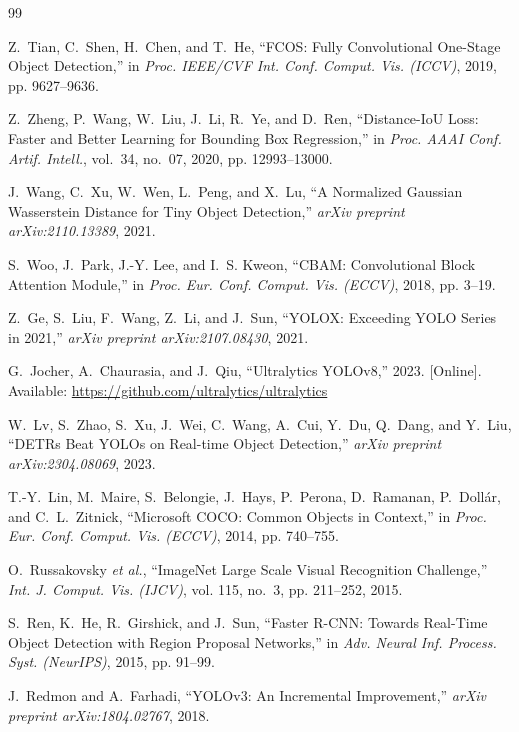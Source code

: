 \documentclass[conference]{IEEEtran}
\begin{document}
\begin{thebibliography}{99}

Z.~Tian, C.~Shen, H.~Chen, and T.~He, ``FCOS: Fully Convolutional One-Stage Object Detection,'' in \textit{Proc. IEEE/CVF Int. Conf. Comput. Vis. (ICCV)}, 2019, pp. 9627--9636.

Z.~Zheng, P.~Wang, W.~Liu, J.~Li, R.~Ye, and D.~Ren, ``Distance-IoU Loss: Faster and Better Learning for Bounding Box Regression,'' in \textit{Proc. AAAI Conf. Artif. Intell.}, vol.~34, no.~07, 2020, pp. 12993--13000.

J.~Wang, C.~Xu, W.~Wen, L.~Peng, and X.~Lu, ``A Normalized Gaussian Wasserstein Distance for Tiny Object Detection,'' \textit{arXiv preprint arXiv:2110.13389}, 2021.

S.~Woo, J.~Park, J.-Y. Lee, and I.~S. Kweon, ``CBAM: Convolutional Block Attention Module,'' in \textit{Proc. Eur. Conf. Comput. Vis. (ECCV)}, 2018, pp. 3--19.

Z.~Ge, S.~Liu, F.~Wang, Z.~Li, and J.~Sun, ``YOLOX: Exceeding YOLO Series in 2021,'' \textit{arXiv preprint arXiv:2107.08430}, 2021.

G.~Jocher, A.~Chaurasia, and J.~Qiu, ``Ultralytics YOLOv8,'' 2023. [Online]. Available: \url{https://github.com/ultralytics/ultralytics}

W.~Lv, S.~Zhao, S.~Xu, J.~Wei, C.~Wang, A.~Cui, Y.~Du, Q.~Dang, and Y.~Liu, ``DETRs Beat YOLOs on Real-time Object Detection,'' \textit{arXiv preprint arXiv:2304.08069}, 2023.

T.-Y.~Lin, M.~Maire, S.~Belongie, J.~Hays, P.~Perona, D.~Ramanan, P.~Doll{\'a}r, and C.~L.~Zitnick, ``Microsoft COCO: Common Objects in Context,'' in \textit{Proc. Eur. Conf. Comput. Vis. (ECCV)}, 2014, pp. 740--755.

O.~Russakovsky \textit{et al.}, ``ImageNet Large Scale Visual Recognition Challenge,'' \textit{Int. J. Comput. Vis. (IJCV)}, vol. 115, no.~3, pp. 211--252, 2015.

S.~Ren, K.~He, R.~Girshick, and J.~Sun, ``Faster R-CNN: Towards Real-Time Object Detection with Region Proposal Networks,'' in \textit{Adv. Neural Inf. Process. Syst. (NeurIPS)}, 2015, pp. 91--99.

J.~Redmon and A.~Farhadi, ``YOLOv3: An Incremental Improvement,'' \textit{arXiv preprint arXiv:1804.02767}, 2018.


\end{thebibliography}
\end{document}
